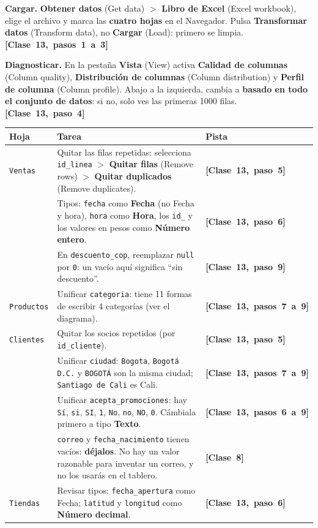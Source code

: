 \documentclass[11pt]{article}
\newcommand{\menu}[2]{\textbf{#1} {\color{black!55}(#2)}}
\newcommand{\vez}[1]{\leavevmode\mbox{\color{esumerTeal}\textbf{[#1]}}}
\newcommand{\subtitulo}[1]{\par\needspace{3\baselineskip}\vspace{4pt}{\large\bfseries\color{esumerNavyDark} #1}\par}
\begin{document}
\textbf{Cargar.} \menu{Obtener datos}{Get data} $>$ \menu{Libro de
Excel}{Excel workbook}, elige el archivo y marca las \textbf{cuatro hojas} en
el Navegador. Pulsa \menu{Transformar datos}{Transform data}, no
\menu{Cargar}{Load}: primero se limpia. \vez{Clase 13, pasos 1 a 3}

\textbf{Diagnosticar.} En la pestaña \menu{Vista}{View} activa
\menu{Calidad de columnas}{Column quality}, \menu{Distribución de
columnas}{Column distribution} y \menu{Perfil de columna}{Column profile}.
Abajo a la izquierda, cambia a \textbf{basado en todo el conjunto de datos}:
si no, solo ves las primeras 1000 filas. \vez{Clase 13, paso 4}

\subtitulo{Lo que tienes que hacer en cada hoja}

\small
\renewcommand{\arraystretch}{1.2}
\begin{tabularx}{\textwidth}{@{}>{\raggedright\arraybackslash}p{2.1cm} >{\raggedright\arraybackslash}X >{\raggedright\arraybackslash}p{3.5cm}@{}}
\toprule
\textbf{Hoja} & \textbf{Tarea} & \textbf{Pista}\\
\midrule
\texttt{Ventas} & Quitar las filas repetidas: selecciona \texttt{id\_linea} $>$ \menu{Quitar filas}{Remove rows} $>$ \menu{Quitar duplicados}{Remove duplicates}. & \vez{Clase 13, paso 5}\\
& Tipos: \texttt{fecha} como \textbf{Fecha} (no Fecha y hora), \texttt{hora} como \textbf{Hora}, los \texttt{id\_} y los valores en pesos como \textbf{Número entero}. & \vez{Clase 13, paso 6}\\
& En \texttt{descuento\_cop}, reemplazar \texttt{null} por \texttt{0}: un vacío aquí significa ``sin descuento''. & \vez{Clase 13, paso 9}\\
\midrule
\texttt{Productos} & Unificar \texttt{categoria}: tiene 11 formas de escribir 4 categorías (ver el diagrama). & \vez{Clase 13, pasos 7 a 9}\\
\midrule
\texttt{Clientes} & Quitar los socios repetidos (por \texttt{id\_cliente}). & \vez{Clase 13, paso 5}\\
& Unificar \texttt{ciudad}: \texttt{Bogota}, \texttt{Bogotá D.C.} y \texttt{BOGOTÁ} son la misma ciudad; \texttt{Santiago de Cali} es Cali. & \vez{Clase 13, pasos 7 a 9}\\
& Unificar \texttt{acepta\_promociones}: hay \texttt{Sí}, \texttt{si}, \texttt{SI}, \texttt{1}, \texttt{No}, \texttt{no}, \texttt{NO}, \texttt{0}. Cámbiala primero a tipo \textbf{Texto}. & \vez{Clase 13, pasos 6 a 9}\\
& \texttt{correo} y \texttt{fecha\_nacimiento} tienen vacíos: \textbf{déjalos}. No hay un valor razonable para inventar un correo, y no los usarás en el tablero. & \vez{Clase 8}\\
\midrule
\texttt{Tiendas} & Revisar tipos: \texttt{fecha\_apertura} como Fecha; \texttt{latitud} y \texttt{longitud} como \textbf{Número decimal}. & \vez{Clase 13, paso 6}\\
\bottomrule
\end{tabularx}
\renewcommand{\arraystretch}{1.0}
\normalsize
\end{document}
